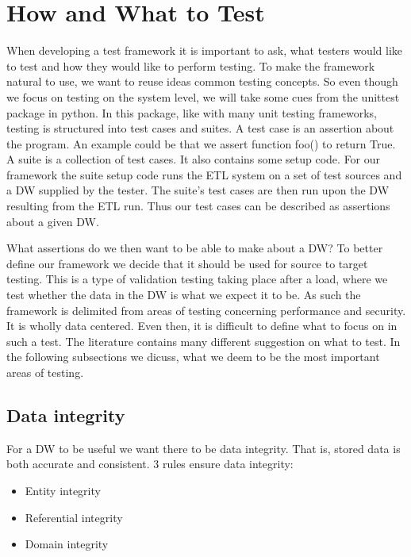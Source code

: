 \section{How and What to Test}
When developing a test framework it is important to ask, what testers would like to test and how they would like to perform testing. To make the framework natural to use, we want to reuse ideas common testing concepts. So even though we focus on testing on the system level, we will take some cues from the unittest package in python. In this package, like with many unit testing frameworks, testing is structured into test cases and suites. A test case is an assertion about the program. An example could be that we assert function foo() to return True.  A suite is a collection of test cases. It also contains some setup code.  For our framework the suite setup code runs the ETL system on a set of test sources and a DW supplied by the tester. The suite’s test cases are then run upon the DW resulting from the ETL run. Thus our test cases can be described as assertions about a given DW.  

What assertions do we then want to be able to make about a DW?  To better define our framework we decide that it should be used for source to target testing. This is a type of validation testing taking place after a load, where we test whether the data in the DW is what we expect it to be. As such the framework is delimited from areas of testing concerning performance and security. It is wholly data centered. Even then, it is difficult to define what to focus on in such a test. The literature contains many different suggestion on what to test.  In the following subsections we dicuss, what we deem to be the most important areas of testing.

\subsection{Data integrity}
For a DW to be useful we want there to be data integrity. That is, stored data is both  accurate and consistent. 3 rules ensure data integrity:  

\begin{itemize}
\item Entity integrity
\item Referential integrity
\item Domain integrity
\end{itemize}

